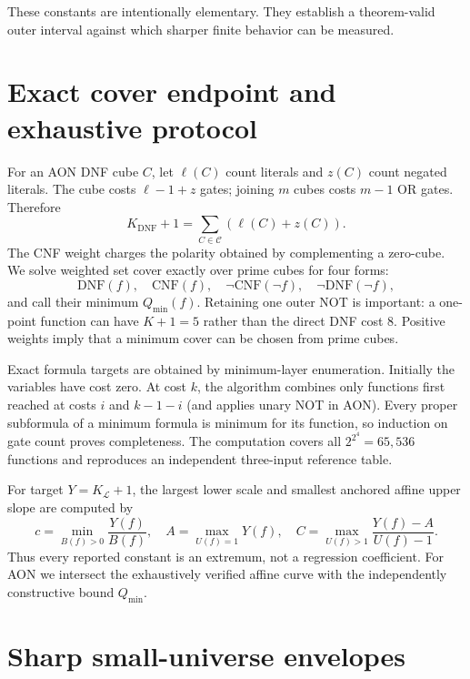 \documentclass[10pt]{article}
\begin{document}
These constants are intentionally elementary.  They establish a theorem-valid
outer interval against which sharper finite behavior can be measured.

\section{Exact cover endpoint and exhaustive protocol}

For an AON DNF cube $C$, let $\ell(C)$ count literals and $z(C)$ count
negated literals.  The cube costs $\ell-1+z$ gates; joining $m$ cubes costs
$m-1$ OR gates.  Therefore
\begin{equation}
 K_{\mathrm{DNF}}+1=\sum_{C\in\mathcal C}(\ell(C)+z(C)).
\end{equation}
The CNF weight charges the polarity obtained by complementing a zero-cube.
We solve weighted set cover exactly over prime cubes for four forms:
\begin{equation}
 \mathrm{DNF}(f),\quad \mathrm{CNF}(f),\quad
 \neg\mathrm{CNF}(\neg f),\quad \neg\mathrm{DNF}(\neg f),
\end{equation}
and call their minimum $Q_{\min}(f)$.  Retaining one outer NOT is important:
a one-point function can have $K+1=5$ rather than the direct DNF cost $8$.
Positive weights imply that a minimum cover can be chosen from prime cubes.

Exact formula targets are obtained by minimum-layer enumeration.  Initially
the variables have cost zero.  At cost $k$, the algorithm combines only
functions first reached at costs $i$ and $k-1-i$ (and applies unary NOT in
AON).  Every proper subformula of a minimum formula is minimum for its
function, so induction on gate count proves completeness.  The computation
covers all $2^{2^4}=65{,}536$ functions and reproduces an independent
three-input reference table.

For target $Y=K_{\mathcal L}+1$, the largest lower scale and smallest anchored
affine upper slope are computed by
\begin{equation}
 c=\min_{B(f)>0}\frac{Y(f)}{B(f)},\quad
 A=\max_{U(f)=1}Y(f),\quad
 C=\max_{U(f)>1}\frac{Y(f)-A}{U(f)-1}.
\end{equation}
Thus every reported constant is an extremum, not a regression coefficient.
For AON we intersect the exhaustively verified affine curve with the
independently constructive bound $Q_{\min}$.

\section{Sharp small-universe envelopes}
\end{document}
